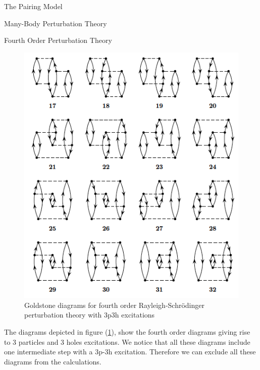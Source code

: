 \documentclass[twoside,english]{uiofysmaster}
\begin{document}
\begin{chapter}{The Pairing Model}
\begin{section}{Many-Body Perturbation Theory}
\begin{subsection}{Fourth Order Perturbation Theory}
			\begin{figure}[H]
				\includegraphics[width=\textwidth]{Figures/fourthorder3p3h.png}
				\caption{Goldstone diagrams for fourth order Rayleigh-Schr\"{o}dinger perturbation theory with 3p3h excitations}
				\label{figure:mbpt3p3h}
			\end{figure}
			The diagrams depicted in figure (\ref{figure:mbpt3p3h}), show the fourth order diagrams giving rise to 3 particles and 3 holes excitations. We notice that all these diagrams include one intermediate step with a 3p-3h excitation. Therefore we can exclude all these diagrams from the calculations.  


\end{subsection}
\end{section}
\end{chapter}
\end{document}
